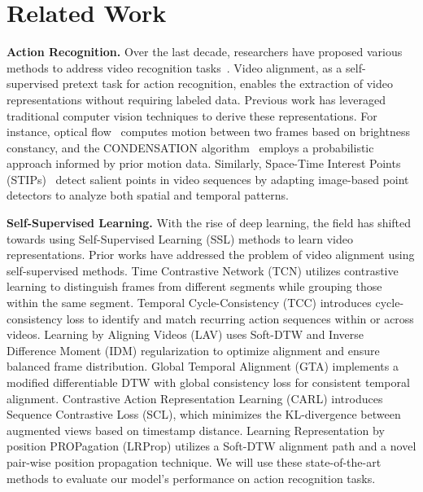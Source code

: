 \section{Related Work}

\textbf{Action Recognition.} Over the last decade, researchers have proposed various methods to address video recognition tasks~\cite{2017_quovadis, 2019_slowfast, 2016_tsn, 2018_trn, 2019_actiontransnet}. Video alignment, as a self-supervised pretext task for action recognition, enables the extraction of video representations without requiring labeled data. Previous work has leveraged traditional computer vision techniques to derive these representations. For instance, optical flow~\cite{1994_opticalflow} computes motion between two frames based on brightness constancy, and the CONDENSATION algorithm~\cite{1998_condensation} employs a probabilistic approach informed by prior motion data. Similarly, Space-Time Interest Points (STIPs)~\cite{2005_stips} detect salient points in video sequences by adapting image-based point detectors to analyze both spatial and temporal patterns.

\noindent \textbf{Self-Supervised Learning.} With the rise of deep learning, the field has shifted towards using Self-Supervised Learning (SSL) methods to learn video representations. Prior works \cite{2017_tcn, 2019_tcc, 2021_lav, 2021_gta, 2022_carl} have addressed the problem of video alignment using self-supervised methods. Time Contrastive Network (TCN) \cite{2017_tcn} utilizes contrastive learning to distinguish frames from different segments while grouping those within the same segment. Temporal Cycle-Consistency (TCC) \cite{2019_tcc} introduces cycle-consistency loss to identify and match recurring action sequences within or across videos. Learning by Aligning Videos (LAV) \cite{2021_lav} uses Soft-DTW \cite{2017_softdtw} and Inverse Difference Moment (IDM) regularization to optimize alignment and ensure balanced frame distribution. Global Temporal Alignment (GTA) \cite{2021_gta} implements a modified differentiable DTW with global consistency loss for consistent temporal alignment. Contrastive Action Representation Learning (CARL) \cite{2022_carl} introduces Sequence Contrastive Loss (SCL), which minimizes the KL-divergence between augmented views based on timestamp distance. Learning Representation by position PROPagation (LRProp) \cite{2024_lrprop} utilizes a Soft-DTW \cite{2017_softdtw} alignment path and a novel pair-wise position propagation technique. We will use these state-of-the-art methods to evaluate our model's performance on action recognition tasks.